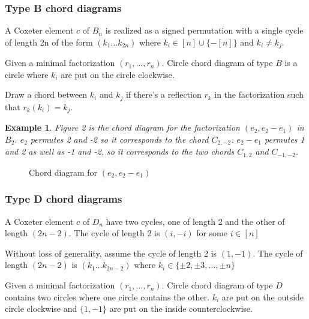 \documentclass[11pt]{amsart}
\newtheorem{exa}[thm]{Example}%
\begin{document}
\subsubsection{Type B chord diagrams}

A Coxeter element $c$ of $B_n$ is realized as a signed permutation with a single cycle of length 2n of the form $(k_1 \dots k_{2n})$ where $k_i \in [n] \cup \{-[n]\}$ and $k_i \neq k_j$.

Given a minimal factorization $(r_1,\dots,r_n)$. Circle chord diagram of type $B$ is a circle where $k_i$ are put on the circle clockwise. 

Draw a chord between $k_i$ and $k_j$ if there's a reflection $r_k$ in the factorization such that $r_k(k_i)=k_j$. 

\begin{exa}
    Figure 2 is the chord diagram for the factorization $(e_2, e_2-e_1)$ in $B_2$. $e_2$ permutes 2 and -2 so it corresponds to the chord $C_{2,-2}$. $e_2-e_1$ permutes 1 and 2 as well as  -1 and -2, so it corresponds to the two chords $C_{1,2}$ and $C_{-1,-2}$.
\end{exa}

\begin{figure}
    \centering
    \caption{Chord diagram for $(e_2,e_2-e_1)$}
\end{figure}

\subsubsection{Type D chord diagrams}

A Coxeter element $c$ of $D_n$ have two cycles, one of length 2 and the other of length $(2n-2)$. The cycle of length 2 is $(i, -i)$ for some $i \in [n]$ 

Without loss of generality, assume the cycle of length 2 is $(1,-1)$. The cycle of length $(2n-2)$ is $(k_1 \dots k_{2n-2})$ where $k_i \in \{\pm2, \pm3, \dots, \pm n\}$

Given a minimal factorization $(r_1,\dots,r_n)$. Circle chord diagram of type $D$ contains two circles where one circle contains the other. $k_i$ are put on the outside circle clockwise and $\{1,-1\}$ are put on the inside counterclockwise.
\end{document}

